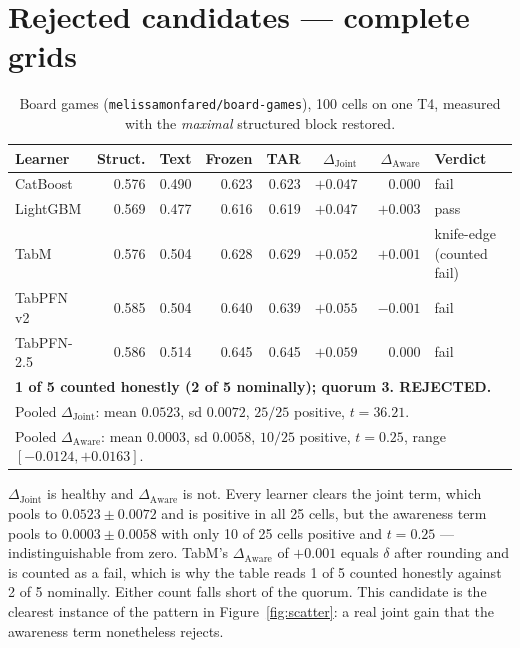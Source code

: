\documentclass[10pt,letterpaper]{article}
\newcommand{\dj}{\Delta_{\mathrm{Joint}}}
\newcommand{\da}{\Delta_{\mathrm{Aware}}}
\begin{document}
\section{Rejected candidates --- complete grids}
\label{app:rejected}

\begin{table}[H]
\centering\small
\caption{Board games (\texttt{melissamonfared/board-games}), 100 cells on one T4, measured
with the \emph{maximal} structured block restored.}
\begin{tabular}{lrrrrrrl}
\toprule
Learner & Struct. & Text & Frozen & TAR & $\dj$ & $\da$ & Verdict \\
\midrule
CatBoost   & 0.576 & 0.490 & 0.623 & 0.623 & $+0.047$ & $\phantom{-}0.000$ & fail \\
LightGBM   & 0.569 & 0.477 & 0.616 & 0.619 & $+0.047$ & $+0.003$ & pass \\
TabM       & 0.576 & 0.504 & 0.628 & 0.629 & $+0.052$ & $+0.001$ & knife-edge (counted fail) \\
TabPFN v2  & 0.585 & 0.504 & 0.640 & 0.639 & $+0.055$ & $-0.001$ & fail \\
TabPFN-2.5 & 0.586 & 0.514 & 0.645 & 0.645 & $+0.059$ & $\phantom{-}0.000$ & fail \\
\midrule
\multicolumn{8}{l}{\textbf{1 of 5 counted honestly (2 of 5 nominally); quorum 3. REJECTED.}} \\
\multicolumn{8}{l}{Pooled $\dj$: mean $0.0523$, sd $0.0072$, $25/25$ positive, $t = 36.21$.} \\
\multicolumn{8}{l}{Pooled $\da$: mean $0.0003$, sd $0.0058$, $10/25$ positive, $t = 0.25$, range $[-0.0124, +0.0163]$.} \\
\bottomrule
\end{tabular}
\end{table}

\noindent $\dj$ is healthy and $\da$ is not. Every learner clears the joint term, which pools to
$0.0523 \pm 0.0072$ and is positive in all 25 cells, but the awareness term pools to
$0.0003 \pm 0.0058$ with only 10 of 25 cells positive and $t = 0.25$ --- indistinguishable
from zero. TabM's $\da$ of $+0.001$ equals $\delta$ after rounding and is counted as a fail,
which is why the table reads 1 of 5 counted honestly against 2 of 5 nominally. Either count
falls short of the quorum. This candidate is the clearest instance of the pattern in
Figure~\ref{fig:scatter}: a real joint gain that the awareness term nonetheless rejects.
\end{document}
